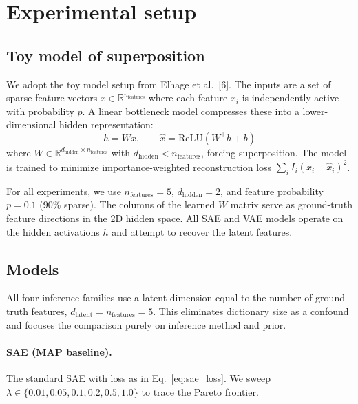 \documentclass{article}
\begin{document}
\section{Experimental setup}
\label{sec:experiments}

\subsection{Toy model of superposition}

We adopt the toy model setup from Elhage et al.~[6]. The inputs are a set of sparse feature vectors $x \in \mathbb{R}^{n_\text{features}}$ where each feature $x_i$ is independently active with probability $p$. A linear bottleneck model compresses these into a lower-dimensional hidden representation:
\begin{equation}
h = Wx, \qquad \hat{x} = \text{ReLU}(W^\top h + b)
\end{equation}
where $W \in \mathbb{R}^{d_\text{hidden} \times n_\text{features}}$ with $d_\text{hidden} < n_\text{features}$, forcing superposition. The model is trained to minimize importance-weighted reconstruction loss $\sum_i I_i(x_i - \hat{x}_i)^2$.

For all experiments, we use $n_\text{features} = 5$, $d_\text{hidden} = 2$, and feature probability $p = 0.1$ (90\% sparse). The columns of the learned $W$ matrix serve as ground-truth feature directions in the 2D hidden space. All SAE and VAE models operate on the hidden activations $h$ and attempt to recover the latent features.

\subsection{Models}

All four inference families use a latent dimension equal to the number of ground-truth features, $d_\text{latent} = n_\text{features} = 5$. This eliminates dictionary size as a confound and focuses the comparison purely on inference method and prior.

\paragraph{SAE (MAP baseline).}
The standard SAE with loss as in Eq.~\eqref{eq:sae_loss}. We sweep $\lambda \in \{0.01, 0.05, 0.1, 0.2, 0.5, 1.0\}$ to trace the Pareto frontier.
\end{document}

